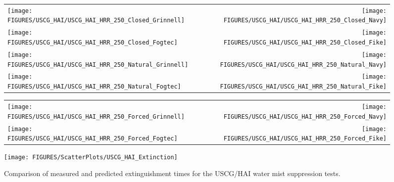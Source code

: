 \begin{figure}[p]
\begin{tabular*}{\textwidth}{l@{\extracolsep{\fill}}r}
\texttt{[image: FIGURES/USCG\_HAI/USCG\_HAI\_HRR\_250\_Closed\_Grinnell]} &
\texttt{[image: FIGURES/USCG\_HAI/USCG\_HAI\_HRR\_250\_Closed\_Navy]} \\
\texttt{[image: FIGURES/USCG\_HAI/USCG\_HAI\_HRR\_250\_Closed\_Fogtec]} &
\texttt{[image: FIGURES/USCG\_HAI/USCG\_HAI\_HRR\_250\_Closed\_Fike]} \\
\texttt{[image: FIGURES/USCG\_HAI/USCG\_HAI\_HRR\_250\_Natural\_Grinnell]} &
\texttt{[image: FIGURES/USCG\_HAI/USCG\_HAI\_HRR\_250\_Natural\_Navy]} \\
\texttt{[image: FIGURES/USCG\_HAI/USCG\_HAI\_HRR\_250\_Natural\_Fogtec]} &
\texttt{[image: FIGURES/USCG\_HAI/USCG\_HAI\_HRR\_250\_Natural\_Fike]}
\end{tabular*}
\label{USCG_HAI_8}
\end{figure}


\begin{figure}[p]
\begin{tabular*}{\textwidth}{l@{\extracolsep{\fill}}r}
\texttt{[image: FIGURES/USCG\_HAI/USCG\_HAI\_HRR\_250\_Forced\_Grinnell]} &
\texttt{[image: FIGURES/USCG\_HAI/USCG\_HAI\_HRR\_250\_Forced\_Navy]} \\
\texttt{[image: FIGURES/USCG\_HAI/USCG\_HAI\_HRR\_250\_Forced\_Fogtec]} &
\texttt{[image: FIGURES/USCG\_HAI/USCG\_HAI\_HRR\_250\_Forced\_Fike]}
\end{tabular*}
\label{USCG_HAI_9}
\end{figure}

\begin{figure}[h!]
\begin{center}
\texttt{[image: FIGURES/ScatterPlots/USCG\_HAI\_Extinction]}
\caption[Extinguishment times for the USCG/HAI water mist suppression tests]{Comparison of measured and predicted extinguishment times for the USCG/HAI water mist suppression tests.}
\label{USCG_Scatter}
\end{center}
\end{figure}
